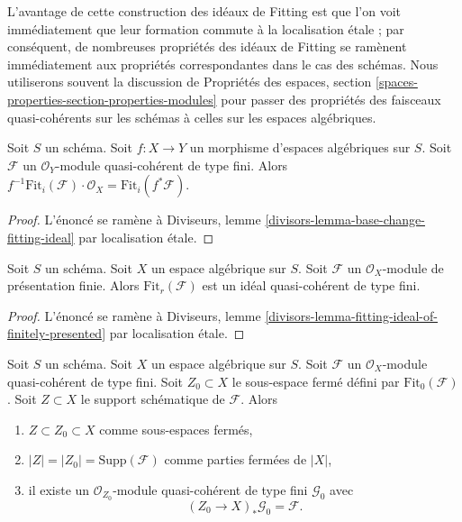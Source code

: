 \medskip\noindent
L'avantage de cette construction des idéaux de Fitting
est que l'on voit immédiatement que leur formation
commute à la localisation \'etale ; par conséquent, de nombreuses propriétés des
idéaux de Fitting se ramènent immédiatement aux propriétés correspondantes
dans le cas des schémas. Nous utiliserons souvent la
discussion de Propriétés des espaces, section
\ref{spaces-properties-section-properties-modules}
pour passer des propriétés des faisceaux quasi-cohérents
sur les schémas à celles sur les espaces algébriques.

\begin{lemma}
\label{lemma-base-change-fitting-ideal}
Soit $S$ un schéma.
Soit $f : X \to Y$ un morphisme d'espaces algébriques sur $S$.
Soit $\mathcal{F}$ un $\mathcal{O}_Y$-module quasi-cohérent de type fini.
Alors
$f^{-1}\text{Fit}_i(\mathcal{F}) \cdot \mathcal{O}_X =
\text{Fit}_i(f^*\mathcal{F})$.
\end{lemma}

\begin{proof}
L'énoncé se ramène à
Diviseurs, lemme \ref{divisors-lemma-base-change-fitting-ideal}
par localisation \'etale.
\end{proof}

\begin{lemma}
\label{lemma-fitting-ideal-of-finitely-presented}
Soit $S$ un schéma. Soit $X$ un espace algébrique sur $S$.
Soit $\mathcal{F}$ un $\mathcal{O}_X$-module de présentation finie.
Alors $\text{Fit}_r(\mathcal{F})$ est un idéal quasi-cohérent de type fini.
\end{lemma}

\begin{proof}
L'énoncé se ramène à
Diviseurs, lemme \ref{divisors-lemma-fitting-ideal-of-finitely-presented}
par localisation \'etale.
\end{proof}

\begin{lemma}
\label{lemma-on-subscheme-cut-out-by-Fit-0}
Soit $S$ un schéma. Soit $X$ un espace algébrique sur $S$.
Soit $\mathcal{F}$ un $\mathcal{O}_X$-module quasi-cohérent de type fini.
Soit $Z_0 \subset X$ le sous-espace fermé défini par
$\text{Fit}_0(\mathcal{F})$.
Soit $Z \subset X$ le support schématique de $\mathcal{F}$.
Alors
\begin{enumerate}
\item $Z \subset Z_0 \subset X$ comme sous-espaces fermés,
\item $|Z| = |Z_0| = \text{Supp}(\mathcal{F})$ comme parties fermées de $|X|$,
\item il existe un $\mathcal{O}_{Z_0}$-module quasi-cohérent de type fini
$\mathcal{G}_0$ avec
$$
(Z_0 \to X)_*\mathcal{G}_0 = \mathcal{F}.
$$
\end{enumerate}
\end{lemma}

